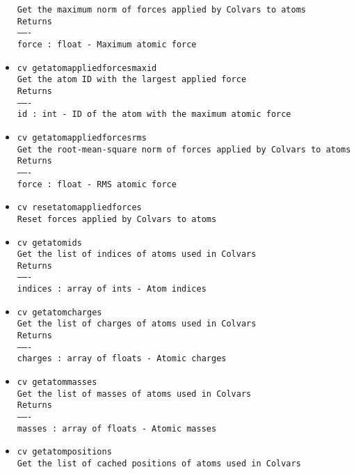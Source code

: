 \begin{itemize}
\texttt{Get the maximum norm of forces applied by Colvars to atoms}
\\
\texttt{Returns}
\\
\texttt{-------}
\\
\texttt{force : float - Maximum atomic force}
\item \texttt{cv getatomappliedforcesmaxid}
\\
\texttt{Get the atom ID with the largest applied force}
\\
\texttt{Returns}
\\
\texttt{-------}
\\
\texttt{id : int - ID of the atom with the maximum atomic force}
\item \texttt{cv getatomappliedforcesrms}
\\
\texttt{Get the root-mean-square norm of forces applied by Colvars to atoms}
\\
\texttt{Returns}
\\
\texttt{-------}
\\
\texttt{force : float - RMS atomic force}
\item \texttt{cv resetatomappliedforces}
\\
\texttt{Reset forces applied by Colvars to atoms}
\item \texttt{cv getatomids}
\\
\texttt{Get the list of indices of atoms used in Colvars}
\\
\texttt{Returns}
\\
\texttt{-------}
\\
\texttt{indices : array of ints - Atom indices}
\item \texttt{cv getatomcharges}
\\
\texttt{Get the list of charges of atoms used in Colvars}
\\
\texttt{Returns}
\\
\texttt{-------}
\\
\texttt{charges : array of floats - Atomic charges}
\item \texttt{cv getatommasses}
\\
\texttt{Get the list of masses of atoms used in Colvars}
\\
\texttt{Returns}
\\
\texttt{-------}
\\
\texttt{masses : array of floats - Atomic masses}
\item \texttt{cv getatompositions}
\\
\texttt{Get the list of cached positions of atoms used in Colvars}

\end{itemize}
